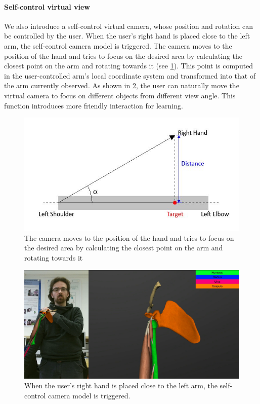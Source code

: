 \paragraph{Self-control virtual view}
We also introduce a self-control virtual camera, whose position and rotation can be controlled by the user. When the user's right hand is placed close to the left arm, the self-control camera model is triggered. The camera moves to the position of the hand and tries to focus on the desired area by calculating the closest point on the arm and rotating towards it (see \figurename{\ref{fig:3-IMR:selfControlCamera}}). This point is computed in the user-controlled arm's local coordinate system and transformed into that of the arm currently observed. As shown in \figurename{\ref{fig:3-IMR:MuscleLearningSelfControlCamera}}, the user can naturally move the virtual camera to focus on different objects from different view angle. This function introduces more friendly interaction for learning.
\begin{figure} [htb]
\centering
\includegraphics[width=0.5\linewidth]{figures/3-IMR/selfControlCamera}
\caption{The camera moves to the position of the hand and tries to focus on the desired area by calculating the closest point on the arm and rotating towards it}
\label{fig:3-IMR:selfControlCamera}
\end{figure}

\begin{figure}
	\centering
	\includegraphics[width=0.7\linewidth]{figures/3-IMR/MuscleLearningSelfControlCamera}
	\caption{When the user's right hand is placed close to the left arm, the self-control camera model is triggered.}
	\label{fig:3-IMR:MuscleLearningSelfControlCamera}
\end{figure}
